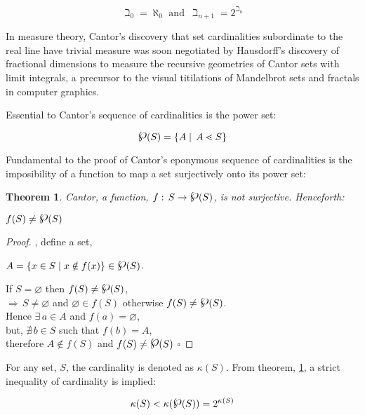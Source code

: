 \documentclass[aps,twocolumn,secnumarabic,nobalancelastpage,amsmath,amssymb,
amsthm,nofootinbib,parskip=full]{revtex4}
\newtheorem{theorem}{Theorem}[section]
\newtheorem{proof}{Proof}[theorem]
\numberwithin{equation}{section}
\newcommand{\pset}[1]{{\raisebox{.15\baselineskip}{\Large\ensuremath{\wp}}}(#1)}
\newcommand{\scard}[1]{\kappa(#1)}
\begin{document}
\begin{equation}
  \beth_0=\aleph_0\,\,\text{and}\,\,\,\beth_{n+1}=2^{\beth_n}
\end{equation}

In measure theory, Cantor's discovery that set
cardinalities subordinate to the real line have trivial measure
was soon negotiated by Hausdorff's discovery of fractional dimensions
to measure the recursive geometries of Cantor sets with limit integrals,
a precursor to the visual titilations of
Mandelbrot sets and fractals in computer graphics.

Essential to Cantor's sequence of cardinalities is the power set:

\begin{equation}\label{eq:pset}
  \pset{S}=\{A\mid\,A\lessdot S\}
\end{equation}

Fundamental to the proof of Cantor's eponymous sequence of cardinalities
is the imposibility of a function to map a set surjectively onto its power set:

\begin{theorem}{Cantor}\label{th:cantor}, a function,
  $f:\,S\rightarrow\pset{S}$,
  is not surjective. Henceforth:
  \begin{center}
    $f(S)\neq\pset{S}$
  \end{center}
\end{theorem}

\begin{proof},
  define a set, \\[3pt]
  \begin{center}
  $A=\{x\in S\mid x\notin f(x)\}\in\pset{S}$.
  \end{center}
  If $S=\varnothing$ then $f(S)\neq\pset{S}$, \\[3pt]
  $\Rightarrow\,S\neq\varnothing$ and
  $\varnothing\in f(S)$ otherwise $f(S)\neq\pset{S}$. \\[3pt]
  Hence $\exists\,a\in A$ and $f(a)=\varnothing$, \\[3pt]
  but, $\nexists\,b\in S$ such that $f(b)=A$, \\[3pt]
  therefore $A\notin f(S)$ and $f(S)\neq\pset{S}$ $\square$
\end{proof}

For any set, $S$, the cardinality is denoted as $\scard{S}$.
From theorem, \ref{th:cantor}, a strict inequality of cardinality
is implied:

\begin{equation}\label{eq:cantor}
  \scard{S}<\scard{\pset{S}}=2^{\scard{S}}
\end{equation}
\end{document}
